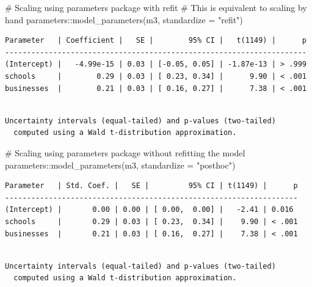\documentclass[
  letterpaper,
]{krantz}
\makeatletter
\newenvironment{Shaded}{\begin{snugshade}}{\end{snugshade}}
\newcommand{\AttributeTok}[1]{\textcolor[rgb]{0.40,0.45,0.13}{#1}}
\newcommand{\CommentTok}[1]{\textcolor[rgb]{0.37,0.37,0.37}{#1}}
\newcommand{\FunctionTok}[1]{\textcolor[rgb]{0.28,0.35,0.67}{#1}}
\newcommand{\NormalTok}[1]{\textcolor[rgb]{0.00,0.23,0.31}{#1}}
\newcommand{\SpecialCharTok}[1]{\textcolor[rgb]{0.37,0.37,0.37}{#1}}
\newcommand{\StringTok}[1]{\textcolor[rgb]{0.13,0.47,0.30}{#1}}
\newenvironment{kframe}{%
\medskip{}
\setlength{\fboxsep}{.8em}
 \def\at@end@of@kframe{}%
 \ifinner\ifhmode%
  \def\at@end@of@kframe{\end{minipage}}%
  \begin{minipage}{\columnwidth}%
 \fi\fi%
 \def\FrameCommand##1{\hskip\@totalleftmargin \hskip-\fboxsep
 \colorbox{shadecolor}{##1}\hskip-\fboxsep
     \hskip-\linewidth \hskip-\@totalleftmargin \hskip\columnwidth}%
 \MakeFramed {\advance\hsize-\width
   \@totalleftmargin\z@ \linewidth\hsize
   \@setminipage}}%
 {\par\unskip\endMakeFramed%
 \at@end@of@kframe}
\renewenvironment{Shaded}{\begin{kframe}}{\end{kframe}}
\makeatother
\begin{document}
\begin{Shaded}
\begin{Highlighting}[]
\CommentTok{\# Scaling using \textquotesingle{}parameters\textquotesingle{} package with refit}
\CommentTok{\# This is equivalent to scaling \textquotesingle{}by hand\textquotesingle{}}
\NormalTok{parameters}\SpecialCharTok{::}\FunctionTok{model\_parameters}\NormalTok{(m3, }\AttributeTok{standardize =} \StringTok{"refit"}\NormalTok{)}
\end{Highlighting}
\end{Shaded}

\begin{verbatim}
Parameter   | Coefficient |   SE |        95% CI |   t(1149) |      p
---------------------------------------------------------------------
(Intercept) |   -4.99e-15 | 0.03 | [-0.05, 0.05] | -1.87e-13 | > .999
schools     |        0.29 | 0.03 | [ 0.23, 0.34] |      9.90 | < .001
businesses  |        0.21 | 0.03 | [ 0.16, 0.27] |      7.38 | < .001
\end{verbatim}

\begin{verbatim}

Uncertainty intervals (equal-tailed) and p-values (two-tailed)
  computed using a Wald t-distribution approximation.
\end{verbatim}

\begin{Shaded}
\begin{Highlighting}[]
\CommentTok{\# Scaling using \textasciigrave{}parameters\textasciigrave{} package without refitting the model}
\NormalTok{parameters}\SpecialCharTok{::}\FunctionTok{model\_parameters}\NormalTok{(m3, }\AttributeTok{standardize =} \StringTok{"posthoc"}\NormalTok{)}
\end{Highlighting}
\end{Shaded}

\begin{verbatim}
Parameter   | Std. Coef. |   SE |         95% CI | t(1149) |      p
-------------------------------------------------------------------
(Intercept) |       0.00 | 0.00 | [ 0.00,  0.00] |   -2.41 | 0.016 
schools     |       0.29 | 0.03 | [ 0.23,  0.34] |    9.90 | < .001
businesses  |       0.21 | 0.03 | [ 0.16,  0.27] |    7.38 | < .001
\end{verbatim}

\begin{verbatim}

Uncertainty intervals (equal-tailed) and p-values (two-tailed)
  computed using a Wald t-distribution approximation.
\end{verbatim}
\end{document}
